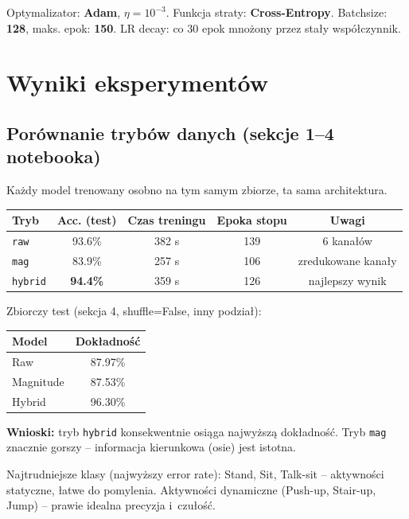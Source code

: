\documentclass[12pt,a4paper]{article}
\begin{document}
Optymalizator: \textbf{Adam}, $\eta=10^{-3}$.
Funkcja straty: \textbf{Cross-Entropy}.
Batchsize: \textbf{128}, maks. epok: \textbf{150}.
LR decay: co 30 epok mnożony przez stały współczynnik.

\section{Wyniki eksperymentów}

\subsection{Porównanie trybów danych (sekcje 1--4 notebooka)}

Każdy model trenowany osobno na tym samym zbiorze, ta sama architektura.

\begin{center}
\begin{tabular}{@{}lcccc@{}}
\toprule
Tryb & Acc. (test) & Czas treningu & Epoka stopu & Uwagi \\
\midrule
\texttt{raw}    & 93.6\%  & 382 s  & 139 & 6 kanałów \\
\texttt{mag}    & 83.9\%  & 257 s  & 106 & zredukowane kanały \\
\texttt{hybrid} & \textbf{94.4\%}  & 359 s  & 126 & najlepszy wynik \\
\bottomrule
\end{tabular}
\end{center}

Zbiorczy test (sekcja 4, shuffle=False, inny podział):
\begin{center}
\begin{tabular}{@{}lc@{}}
\toprule
Model & Dokładność \\
\midrule
Raw    & 87.97\% \\
Magnitude & 87.53\% \\
Hybrid & 96.30\% \\
\bottomrule
\end{tabular}
\end{center}

\textbf{Wnioski:} tryb \texttt{hybrid} konsekwentnie osiąga najwyższą dokładność. Tryb \texttt{mag} znacznie gorszy -- informacja kierunkowa (osie) jest istotna.

Najtrudniejsze klasy (najwyższy error rate): Stand, Sit, Talk-sit -- aktywności statyczne, łatwe do pomylenia. Aktywności dynamiczne (Push-up, Stair-up, Jump) -- prawie idealna precyzja i~czułość.
\end{document}
